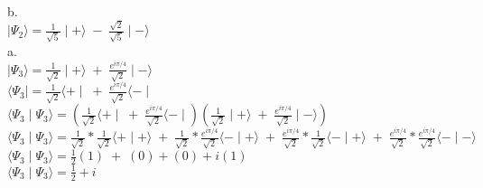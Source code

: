 \documentclass{article}
\begin{document}
b.\\
$\mid\Psi_2\rangle=\frac{1}{\sqrt{5}}\mid+\rangle \;-\; \frac{\sqrt{2}}{\sqrt{5}}\mid-\rangle$\\

a.\\
$\mid\Psi_3\rangle=\frac{1}{\sqrt{2}}\mid+\rangle \;+\; \frac{e^{i\pi/4}}{\sqrt{2}}\mid-\rangle$\\
$\langle\Psi_3\mid=\frac{1}{\sqrt{2}}\langle+\mid \;+\; \frac{e^{i\pi/4}}{\sqrt{2}}\langle-\mid$\\
$\langle\Psi_3\mid\Psi_3\rangle=(\frac{1}{\sqrt{2}}\langle+\mid \;+\; \frac{e^{i\pi/4}}{\sqrt{2}}\langle-\mid)(\frac{1}{\sqrt{2}}\mid+\rangle \;+\; \frac{e^{i\pi/4}}{\sqrt{2}}\mid-\rangle)$\\
$\langle\Psi_3\mid\Psi_3\rangle=\frac{1}{\sqrt{2}}*\frac{1}{\sqrt{2}}\langle+\mid+\rangle \;+\; \frac{1}{\sqrt{2}}*\frac{e^{i\pi/4}}{\sqrt{2}}\langle-\mid+\rangle \;+\; \frac{e^{i\pi/4}}{\sqrt{2}}*\frac{1}{\sqrt{2}}\langle-\mid+\rangle \;+\; \frac{e^{i\pi/4}}{\sqrt{2}}*\frac{e^{i\pi/4}}{\sqrt{2}}\langle-\mid-\rangle$\\
$\langle\Psi_3\mid\Psi_3\rangle=\frac{1}{2}(1)\;+\;(0)+(0)+i(1)$\\
$\langle\Psi_3\mid\Psi_3\rangle=\frac{1}{2}+i$
\end{document}
